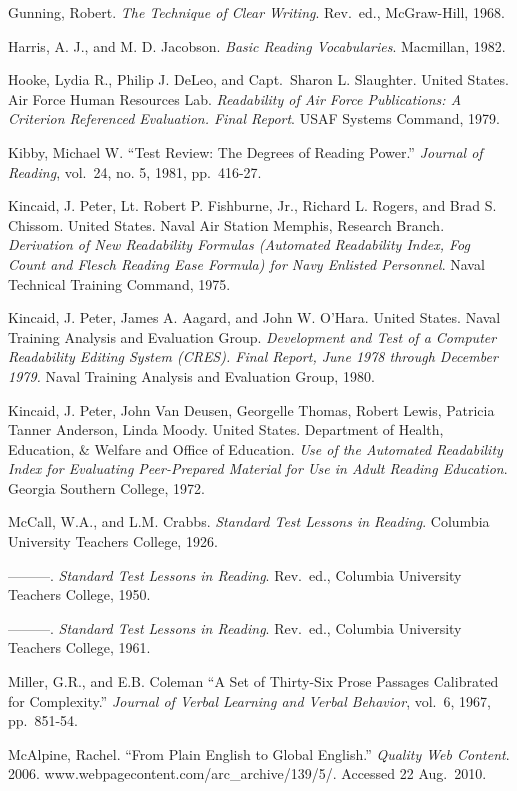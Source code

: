 \documentclass[
]{book}
\theoremstyle{definition}
\theoremstyle{definition}
\theoremstyle{definition}
\theoremstyle{definition}
\theoremstyle{remark}
\begin{document}
Gunning, Robert. \emph{The Technique of Clear Writing}. Rev.~ed., McGraw-Hill, 1968.

Harris, A. J., and M. D. Jacobson. \emph{Basic Reading Vocabularies}. Macmillan, 1982.

Hooke, Lydia R., Philip J. DeLeo, and Capt.~Sharon L. Slaughter. United States. Air Force Human Resources Lab. \emph{Readability of Air Force Publications: A Criterion Referenced Evaluation. Final Report}. USAF Systems Command, 1979.

Kibby, Michael W. ``Test Review: The Degrees of Reading Power.'' \emph{Journal of Reading}, vol.~24, no. 5, 1981, pp.~416-27.

Kincaid, J. Peter, Lt. Robert P. Fishburne, Jr., Richard L. Rogers, and Brad S. Chissom. United States. Naval Air Station Memphis, Research Branch. \emph{Derivation of New Readability Formulas (Automated Readability Index, Fog Count and Flesch Reading Ease Formula) for Navy Enlisted Personnel}. Naval Technical Training Command, 1975.

Kincaid, J. Peter, James A. Aagard, and John W. O'Hara. United States. Naval Training Analysis and Evaluation Group. \emph{Development and Test of a Computer Readability Editing System (CRES). Final Report, June 1978 through December 1979.} Naval Training Analysis and Evaluation Group, 1980.

Kincaid, J. Peter, John Van Deusen, Georgelle Thomas, Robert Lewis, Patricia Tanner Anderson, Linda Moody. United States. Department of Health, Education, \& Welfare and Office of Education. \emph{Use of the Automated Readability Index for Evaluating Peer-Prepared Material for Use in Adult Reading Education}. Georgia Southern College, 1972.

McCall, W.A., and L.M. Crabbs. \emph{Standard Test Lessons in Reading}. Columbia University Teachers College, 1926.

---------. \emph{Standard Test Lessons in Reading}. Rev.~ed., Columbia University Teachers College, 1950.

---------. \emph{Standard Test Lessons in Reading}. Rev.~ed., Columbia University Teachers College, 1961.

Miller, G.R., and E.B. Coleman ``A Set of Thirty-Six Prose Passages Calibrated for Complexity.'' \emph{Journal of Verbal Learning and Verbal Behavior}, vol.~6, 1967, pp.~851-54.

McAlpine, Rachel. ``From Plain English to Global English.'' \emph{Quality Web Content}. 2006. www.webpagecontent.com/arc\_archive/139/5/. Accessed 22 Aug.~2010.
\end{document}
